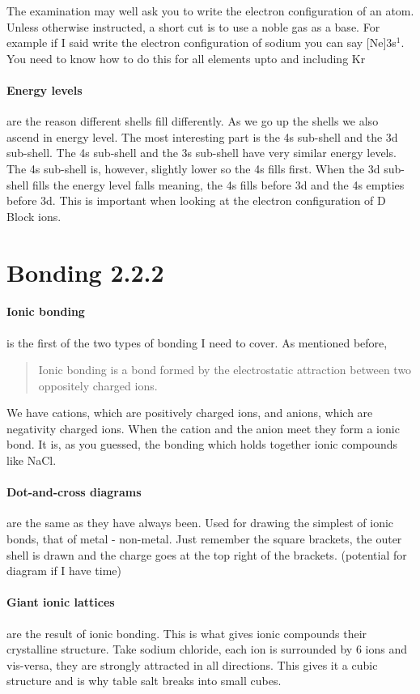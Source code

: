 	The examination may well ask you to write the electron configuration of an atom. Unless otherwise instructed, a short cut is to use a noble gas as a base. For example if I said write the electron configuration of sodium you can say [Ne]3s$^1$. You need to know how to do this for all elements upto and including Kr
	
	\paragraph{Energy levels} are the reason different shells fill differently. As we go up the shells we also ascend in energy level. The most interesting part is the 4s sub-shell and the 3d sub-shell. The 4s sub-shell and the 3s sub-shell have very similar energy levels. The 4s sub-shell is, however, slightly lower so the 4s fills first. When the 3d sub-shell fills the energy level falls meaning, the 4s fills before 3d and the 4s empties before 3d. This is important when looking at the electron configuration of D Block ions.
	
\section{Bonding 2.2.2}

	\paragraph{Ionic bonding} is the first of the two types of bonding I need to cover. As mentioned before,
	\begin{quote}
		Ionic bonding is a bond formed by the electrostatic attraction between two oppositely charged ions.
	\end{quote}
	We have cations, which are positively charged ions, and anions, which are negativity charged ions. When the cation and the anion meet they form a ionic bond. It is, as you guessed, the bonding which holds together ionic compounds like NaCl.
	 
	\paragraph{Dot-and-cross diagrams} are the same as they have always been. Used for drawing the simplest of ionic bonds, that of metal - non-metal. Just remember the square brackets, the outer shell is drawn and the charge goes at the top right of the brackets. (potential for diagram if I have time)
	 
	\paragraph{Giant ionic lattices} are the result of ionic bonding. This is what gives ionic compounds their crystalline structure. Take sodium chloride, each  ion is surrounded by 6  ions and vis-versa, they are strongly attracted in all directions. This gives it a cubic structure and is why table salt breaks into small cubes. 
	 
